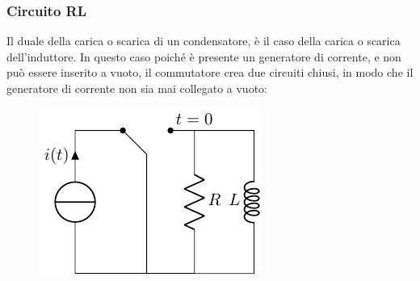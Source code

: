 \documentclass{article}
\numberwithin{equation}{subsection}
\begin{document}
\subsubsection{Circuito RL}
Il duale della carica o scarica di un condensatore, è il caso della carica o scarica dell'induttore. In questo caso poiché è presente un generatore di corrente, e non 
può essere inserito a vuoto, il commutatore crea due circuiti chiusi, in modo che il generatore di corrente non sia mai collegato a vuoto:
\begin{figure}[H]%
    \centering
    \includegraphics{circuito-rl-tempo-continuo.pdf}%
    \label{fig:circuito-rl}
\end{figure}
\end{document}
